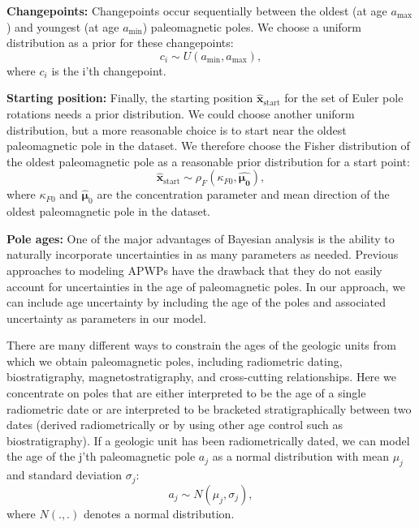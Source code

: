 \documentclass[]{agujournal2019}
\begin{document}
\textbf{Changepoints:} 
Changepoints occur sequentially between the oldest (at age $a_\mathrm{max}$) and youngest (at age $a_\mathrm{min}$) paleomagnetic poles. We choose a uniform distribution as a prior for these changepoints:
\begin{equation}
c_i \sim U( a_\mathrm{min}, a_\mathrm{max}),
\end{equation}
where $c_i$ is the i'th changepoint.

\textbf{Starting position:}
Finally, the starting position $\hat{\mathbf{x}}_\mathrm{start}$ for the set of Euler pole rotations needs a prior distribution. We could choose another uniform distribution, but a more reasonable choice is to start near the oldest paleomagnetic pole in the dataset. We therefore choose the Fisher distribution of the oldest paleomagnetic pole as a reasonable prior distribution for a start point:
\begin{equation}
\hat{\mathbf{x}}_\mathrm{start} \sim \rho_F(\kappa_{F0}, \hat{\mathbf{\mu_0}}),
\end{equation}
where $\kappa_{F0}$ and $\hat{\mathbf{\mu}}_0$ are the concentration parameter and mean direction of the oldest paleomagnetic pole in the dataset.

\textbf{Pole ages:}
One of the major advantages of Bayesian analysis is the ability to naturally incorporate uncertainties in as many parameters as needed. Previous approaches to modeling APWPs have the drawback that they do not easily account for uncertainties in the age of paleomagnetic poles. In our approach, we can include age uncertainty by including the age of the poles and associated uncertainty as parameters in our model.

There are many different ways to constrain the ages of the geologic units from which we obtain paleomagnetic poles, including radiometric dating, biostratigraphy, magnetostratigraphy, and cross-cutting relationships. Here we concentrate on poles that are either interpreted to be the age of a single radiometric date or are interpreted to be bracketed stratigraphically between two dates (derived radiometrically or by using other age control such as biostratigraphy). If a geologic unit has been radiometrically dated, we can model the age of the j'th paleomagnetic pole $a_j$ as a normal distribution with mean $\mu_j$ and standard deviation $\sigma_j$:
\begin{equation}
a_j \sim N(\mu_j, \sigma_j),
\end{equation}
where $N(.,.)$ denotes a normal distribution.
\end{document}

